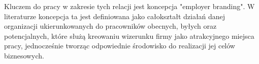 Kluczem do pracy w zakresie tych relacji jest koncepcja "employer branding".
W literaturze koncepcja ta jest definiowana jako
całokształt działań danej organizacji ukierunkowanych do pracowników obecnych, byłych oraz potencjalnych,
które służą kreowaniu wizerunku firmy jako atrakcyjnego miejsca pracy,
jednocześnie tworząc odpowiednie środowisko do realizacji jej celów biznesowych.



\thispagestyle{normal}
